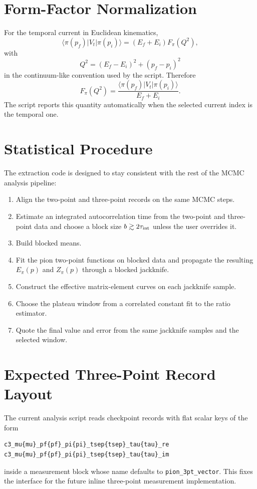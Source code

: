 \documentclass[11pt]{article}
\begin{document}
\section{Form-Factor Normalization}
For the temporal current in Euclidean kinematics,
\begin{equation}
  \langle \pi(p_f)|V_t|\pi(p_i)\rangle
  =
  \left(E_f + E_i\right) F_\pi(Q^2),
\end{equation}
with
\begin{equation}
  Q^2 = (E_f-E_i)^2 + (p_f-p_i)^2
\end{equation}
in the continuum-like convention used by the script. Therefore
\begin{equation}
  F_\pi(Q^2)
  =
  \frac{
    \langle \pi(p_f)|V_t|\pi(p_i)\rangle
  }{
    E_f + E_i
  }.
\end{equation}
The script reports this quantity automatically when the selected current index
is the temporal one.

\section{Statistical Procedure}
The extraction code is designed to stay consistent with the rest of the MCMC
analysis pipeline:
\begin{enumerate}
  \item Align the two-point and three-point records on the same MCMC steps.
  \item Estimate an integrated autocorrelation time from the two-point and
  three-point data and choose a block size $b \gtrsim 2\tau_{\rm int}$ unless
  the user overrides it.
  \item Build blocked means.
  \item Fit the pion two-point functions on blocked data and propagate the
  resulting $E_\pi(p)$ and $Z_\pi(p)$ through a blocked jackknife.
  \item Construct the effective matrix-element curves on each jackknife sample.
  \item Choose the plateau window from a correlated constant fit to the ratio
  estimator.
  \item Quote the final value and error from the same jackknife samples and the
  selected window.
\end{enumerate}

\section{Expected Three-Point Record Layout}
The current analysis script reads checkpoint records with flat scalar keys of
the form
\begin{verbatim}
c3_mu{mu}_pf{pf}_pi{pi}_tsep{tsep}_tau{tau}_re
c3_mu{mu}_pf{pf}_pi{pi}_tsep{tsep}_tau{tau}_im
\end{verbatim}
inside a measurement block whose name defaults to
\texttt{pion\_3pt\_vector}. This fixes the interface for the future inline
three-point measurement implementation.
\end{document}
